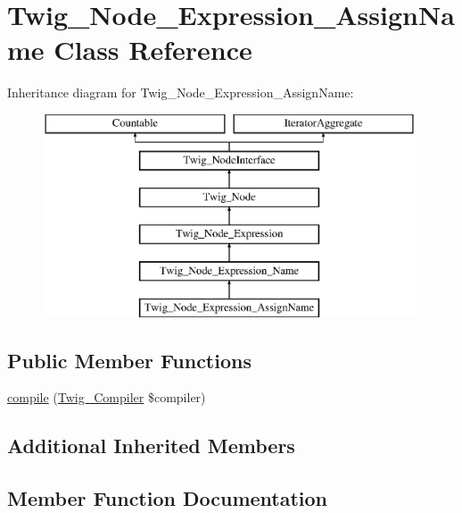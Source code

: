 \hypertarget{class_twig___node___expression___assign_name}{}\section{Twig\+\_\+\+Node\+\_\+\+Expression\+\_\+\+Assign\+Name Class Reference}
\label{class_twig___node___expression___assign_name}
Inheritance diagram for Twig\+\_\+\+Node\+\_\+\+Expression\+\_\+\+Assign\+Name\+:\begin{figure}[H]
\begin{center}
\leavevmode
\includegraphics[height=6.000000cm]{class_twig___node___expression___assign_name}
\end{center}
\end{figure}
\subsection*{Public Member Functions}
\begin{DoxyCompactItemize}
\item 
\hyperlink{class_twig___node___expression___assign_name_a4e0faa87c3fae583620b84d3607085da}{compile} (\hyperlink{class_twig___compiler}{Twig\+\_\+\+Compiler} \$compiler)
\end{DoxyCompactItemize}
\subsection*{Additional Inherited Members}


\subsection{Member Function Documentation}
\hypertarget{class_twig___node___expression___assign_name_a4e0faa87c3fae583620b84d3607085da}{}
